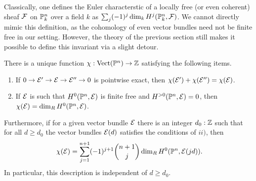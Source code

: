 Classically, one defines the Euler characterstic of a locally free (or even coherent) sheaf $\mathcal{F}$ on $\mathbb{P}^n_k$ over a field $k$ as $\sum_j (-1)^j \dim_k H^j(\mathbb{P}^n_k, \mathcal{F})$.
We cannot directly mimic this definition, as the cohomology of even vector bundles need not be finite free in our setting.
However, the theory of the previous section still makes it possible to define this invariant via a slight detour.

\begin{lemma}
  \label{axiomatized-euler-characteristic-for-P^n}
  There is a unique function $\chi : \mathrm{Vect}(\mathbb{P}^n) \to \mathbb Z$ satisfying the following items.
  \begin{enumerate}
    \item[i)] If $0 \to \mathcal{E}' \to \mathcal{E} \to \mathcal{E}'' \to 0$ is pointwise exact, then $\chi(\mathcal{E}') + \chi(\mathcal{E}'') = \chi(\mathcal{E})$.

    \item[ii)] If $\mathcal{E}$ is such that $H^0(\mathbb{P}^n, \mathcal{E})$ is finite free and $H^{>0}(\mathbb{P}^n, \mathcal{E}) = 0$, then $\chi(\mathcal{E}) = \dim_R H^0(\mathbb{P}^n, \mathcal{E})$.
  \end{enumerate}
  Furthermore, if for a given vector bundle $\mathcal{E}$ there is an integer $d_0:\mathbb Z$ such that for all $d \geq d_0$ the vector bundles $\mathcal{E}(d)$ satisfies the conditions of $ii)$, then
  \[
    \chi(\mc E) = \sum_{j=1}^{n+1} (-1)^{j+1} \binom{n+1}{j} \dim_R H^0(\bP^n,\mc E(jd)) \rlap{.}
  \]
  In particular, this description is independent of $d \geq d_0$.
\end{lemma}

